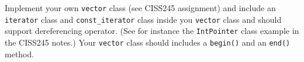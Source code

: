   Implement your own \verb!vector! class (see CISS245 assignment) and include
  an \verb!iterator! class
  and
  \verb!const_iterator! class
  inside you
  \verb!vector! class
  and should support dereferencing operator. 
  (See for instance the \verb!IntPointer! class
  example in the CISS245 notes.)
  Your \verb!vector! class should includes a
  \verb!begin()! and an \verb!end()! method.
